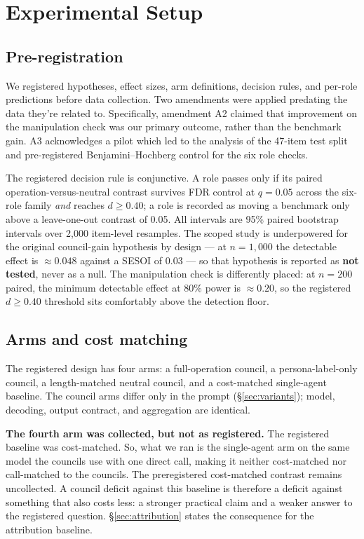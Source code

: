 \section{Experimental Setup}
\label{sec:setup}

\subsection{Pre-registration}
\label{sec:prereg}

We registered hypotheses, effect sizes, arm definitions, decision rules, and per-role predictions
before data collection. Two amendments were applied predating the data they're related to.
Specifically, amendment A2 claimed that improvement on the manipulation check was our primary
outcome, rather than the benchmark gain. A3 acknowledges a pilot which led to the analysis of the
47-item test split and pre-registered Benjamini--Hochberg control for the six role checks.

The registered decision rule is conjunctive. A role passes only if its paired
operation-versus-neutral contrast survives FDR control at $q = 0.05$ across the six-role family
\emph{and} reaches $d \ge 0.40$; a role is recorded as moving a benchmark only above a
leave-one-out contrast of 0.05. All intervals are 95\% paired bootstrap intervals over 2,000
item-level resamples. The scoped study is underpowered for the original council-gain hypothesis by
design --- at $n = 1{,}000$ the detectable effect is $\approx 0.048$ against a SESOI of 0.03 --- so
that hypothesis is reported as \textbf{not tested}, never as a null. The manipulation check is
differently placed: at $n = 200$ paired, the minimum detectable effect at 80\% power is
$\approx 0.20$, so the registered $d \ge 0.40$ threshold sits comfortably above the detection floor.

\subsection{Arms and cost matching}
\label{sec:arms}

The registered design has four arms: a full-operation council, a persona-label-only council, a
length-matched neutral council, and a cost-matched single-agent baseline. The council arms differ
only in the prompt (\S\ref{sec:variants}); model, decoding, output contract, and aggregation are
identical.

\textbf{The fourth arm was collected, but not as registered.} The registered baseline was
cost-matched. So, what we ran is the single-agent arm on the same model the councils use with one
direct call, making it neither cost-matched nor call-matched to the councils. The preregistered
cost-matched contrast remains uncollected. A council deficit against this baseline is therefore a
deficit against something that also costs less: a stronger practical claim and a weaker answer to
the registered question. \S\ref{sec:attribution} states the consequence for the attribution
baseline.


